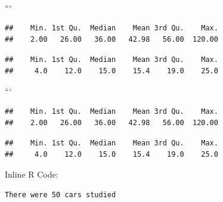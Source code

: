 \documentclass[]{book}
\newenvironment{Shaded}{\begin{snugshade}}{\end{snugshade}}
\newcommand{\KeywordTok}[1]{\textcolor[rgb]{0.13,0.29,0.53}{\textbf{#1}}}
\newcommand{\NormalTok}[1]{#1}
\newcommand{\OperatorTok}[1]{\textcolor[rgb]{0.81,0.36,0.00}{\textbf{#1}}}
\begin{document}
```

\begin{Shaded}
\end{Shaded}

\begin{verbatim}
##    Min. 1st Qu.  Median    Mean 3rd Qu.    Max. 
##    2.00   26.00   36.00   42.98   56.00  120.00
\end{verbatim}

\begin{Shaded}
\end{Shaded}

\begin{verbatim}
##    Min. 1st Qu.  Median    Mean 3rd Qu.    Max. 
##     4.0    12.0    15.0    15.4    19.0    25.0
\end{verbatim}

```

\begin{Shaded}
\end{Shaded}

\begin{verbatim}
##    Min. 1st Qu.  Median    Mean 3rd Qu.    Max. 
##    2.00   26.00   36.00   42.98   56.00  120.00
\end{verbatim}

\begin{Shaded}
\end{Shaded}

\begin{verbatim}
##    Min. 1st Qu.  Median    Mean 3rd Qu.    Max. 
##     4.0    12.0    15.0    15.4    19.0    25.0
\end{verbatim}

Inline R Code:

\begin{verbatim}
There were 50 cars studied
\end{verbatim}
\end{document}
